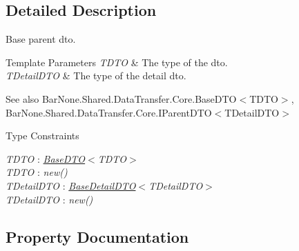 \subsection{Detailed Description}
Base parent dto. 


\begin{DoxyTemplParams}{Template Parameters}
{\em T\+D\+TO} & The type of the dto.\\
\hline
{\em T\+Detail\+D\+TO} & The type of the detail dto.\\
\hline
\end{DoxyTemplParams}
\begin{DoxySeeAlso}{See also}
Bar\+None.\+Shared.\+Data\+Transfer.\+Core.\+Base\+D\+T\+O$<$\+T\+D\+T\+O$>$, Bar\+None.\+Shared.\+Data\+Transfer.\+Core.\+I\+Parent\+D\+T\+O$<$\+T\+Detail\+D\+T\+O$>$


\end{DoxySeeAlso}
\begin{Desc}
\item[Type Constraints]\begin{description}
\item[{\em T\+D\+TO} : {\em \mbox{\hyperlink{class_bar_none_1_1_shared_1_1_data_transfer_1_1_core_1_1_base_d_t_o}{Base\+D\+TO}}$<$T\+D\+TO$>$}]\item[{\em T\+D\+TO} : {\em new()}]\item[{\em T\+Detail\+D\+TO} : {\em \mbox{\hyperlink{class_bar_none_1_1_shared_1_1_data_transfer_1_1_core_1_1_base_detail_d_t_o}{Base\+Detail\+D\+TO}}$<$T\+Detail\+D\+TO$>$}]\item[{\em T\+Detail\+D\+TO} : {\em new()}]\end{description}
\end{Desc}


\subsection{Property Documentation}
\mbox{\label{class_bar_none_1_1_shared_1_1_data_transfer_1_1_core_1_1_base_parent_d_t_o_ad96233dd2fec5a0191ebd4ff0d53488e}} 

